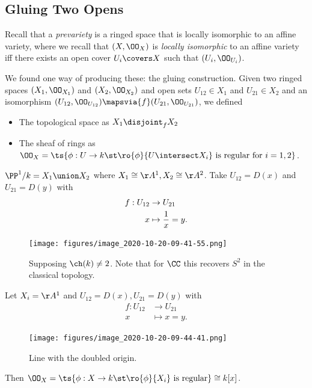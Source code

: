 \hypertarget{gluing-two-opens}{%
\subsection{Gluing Two Opens}\label{gluing-two-opens}}

Recall that a \emph{prevariety} is a ringed space that is locally
isomorphic to an affine variety, where we recall that \((X, \OO_X)\) is
\emph{locally isomorphic} to an affine variety iff there exists an open
cover \(U_i \covers X\) such that \((U_i, \OO_{U_i})\).

We found one way of producing these: the gluing construction. Given two
ringed spaces \((X_1, \OO_{X_1})\) and \((X_2, \OO_{X_2})\) and open
sets \(U_{12} \in X_1\) and \(U_{21} \in X_2\) and an isomorphism
\((U_{12}, \OO_{U_{12}}) \mapsvia{f} (U_{21}, \OO_{U_{21}})\), we
defined

\begin{itemize}
\tightlist
\item
  The topological space as \(X_1 \disjoint_f X_2\)
\item
  The sheaf of rings as
  \(\OO_X = \ts{\phi:U\to k \st\ro{\phi}{U\intersect X_i} \text{ is regular for } i=1,2 }\).
\end{itemize}

\begin{example}

\(\PP^1/k = X_1 \union X_2\) where \(X_1 \cong \AA^1, X_2 \cong \AA^2\).
Take \(U_{12} = D(x)\) and \(U_{21} = D(y)\) with
\begin{align*}  
f: U_{12} &\to U_{21} \\
x &\mapsto {1\over x} = y
.\end{align*}

\begin{figure}
\centering
\texttt{[image: figures/image\_2020-10-20-09-41-55.png]}
\caption{Supposing \(\ch(k) \neq 2\). Note that for \(\CC\) this
recovers \(S^2\) in the classical topology.}
\end{figure}

\end{example}

\begin{example}

Let \(X_i = \AA^1\) and \(U_{12} = D(x), U_{21} = D(y)\) with
\begin{align*}  
f: U_{12} &\to U_{21} \\
x &\mapsto x=y
.\end{align*}

\begin{figure}
\centering
\texttt{[image: figures/image\_2020-10-20-09-44-41.png]}
\caption{Line with the doubled origin.}
\end{figure}

Then
\(\OO_X = \ts{\phi: X\to k \st \ro{\phi}{X_i} \text{ is regular}} \cong k[x]\).

\end{example}

